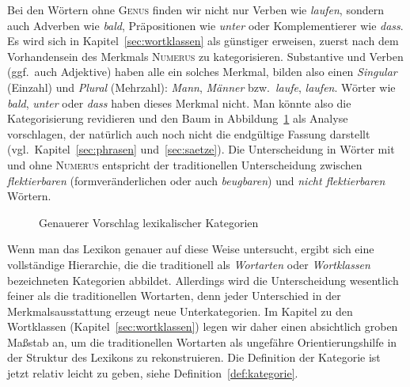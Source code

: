 
Bei den Wörtern ohne \textsc{Genus} finden wir nicht nur Verben wie \textit{laufen}, sondern auch Adverben wie \textit{bald}, Präpositionen wie \textit{unter} oder Komplementierer wie \textit{dass}.
Es wird sich in Kapitel~\ref{sec:wortklassen} als günstiger erweisen, zuerst nach dem Vorhandensein des Merkmals \textsc{Numerus} zu kategorisieren.
Substantive und Verben (ggf.\ auch Adjektive) haben alle ein solches Merkmal, bilden also einen \textit{Singular} (Einzahl) und \textit{Plural} (Mehrzahl): \textit{Mann}, \textit{Männer} bzw.\ \textit{laufe}, \textit{laufen}.
Wörter wie \textit{bald}, \textit{unter} oder \textit{dass} haben dieses Merkmal nicht.
Man könnte also die Kategorisierung revidieren und den Baum in Abbildung~\ref{fig:kategorien003} als Analyse vorschlagen, der natürlich auch noch nicht die endgültige Fassung darstellt (vgl.\ Kapitel~\ref{sec:phrasen} und~\ref{sec:saetze}).
Die Unterscheidung in Wörter mit und ohne \textsc{Numerus} entspricht der traditionellen Unterscheidung zwischen \textit{flektierbaren} (formveränderlichen oder auch \textit{beugbaren}) und \textit{nicht flektierbaren} Wörtern.

\begin{figure}[!htbp]
\centering
  \caption{Genauerer Vorschlag lexikalischer Kategorien}
  \label{fig:kategorien003}
\end{figure}


Wenn man das Lexikon genauer auf diese Weise untersucht, ergibt sich eine vollständige Hierarchie, die die traditionell als \textit{Wortarten} oder \textit{Wortklassen} bezeichneten Kategorien abbildet.
Allerdings wird die Unterscheidung wesentlich feiner als die traditionellen Wortarten, denn jeder Unterschied in der Merkmalsausstattung erzeugt neue Unterkategorien.
Im Kapitel zu den Wortklassen (Kapitel~\ref{sec:wortklassen}) legen wir daher einen absichtlich groben Maßstab an, um die traditionellen Wortarten als ungefähre Orientierungshilfe in der Struktur des Lexikons zu rekonstruieren.
Die Definition der Kategorie ist jetzt relativ leicht zu geben, siehe Definition~\ref{def:kategorie}.

